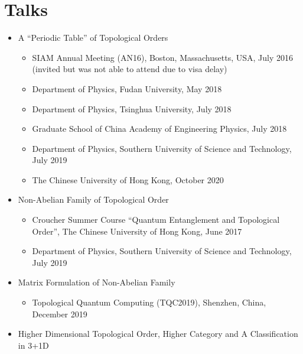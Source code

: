 \documentclass[hidelinks,a4paper]{article}
\begin{document}
\section*{Talks}
\begin{itemize}
\item A ``Periodic Table'' of Topological Orders

  \begin{itemize}\tiny
    \item SIAM Annual Meeting (AN16), Boston, Massachusetts, USA, July 2016 (invited but was not able to attend due to visa delay)
    \item Department of Physics, Fudan University, May 2018
    \item Department of Physics, Tsinghua University, July 2018
    \item Graduate School of China Academy of Engineering Physics, July 2018
    \item Department of Physics, Southern University of Science and Technology, July 2019
    \item The Chinese University of Hong Kong, October 2020
  \end{itemize}
  \item Non-Abelian Family of Topological Order~\supercite{LW1701.07820}

    \begin{itemize}\tiny
      \item Croucher Summer Course “Quantum Entanglement and Topological Order”,
	The Chinese University of Hong Kong, June 2017
      \item 
	Department of Physics, Southern University of Science and Technology, July 2019
  \end{itemize}
\item Matrix Formulation of Non-Abelian Family~\supercite{Lan1908.02599}
  \begin{itemize}\tiny
    \item Topological Quantum Computing (TQC2019), Shenzhen, China, December 2019
  \end{itemize}
\item Higher Dimensional Topological Order, Higher Category and A Classification
  in 3+1D~\supercite{LKW1704.04221,LW1801.08530}


\end{itemize}
\end{document}
